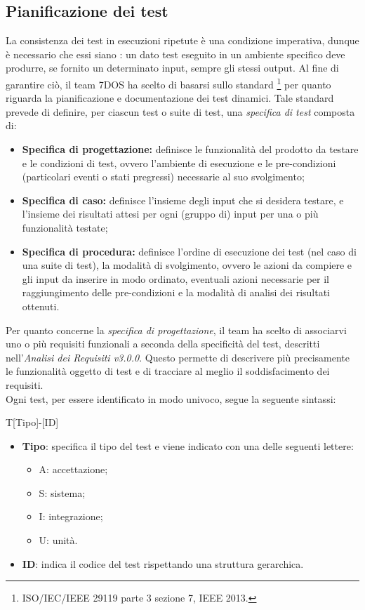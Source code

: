 \subsection{Pianificazione dei test}
La consistenza dei test in esecuzioni ripetute è una condizione imperativa, dunque è necessario che essi siano : un dato test eseguito in un ambiente specifico deve produrre, se fornito un determinato input, sempre gli stessi output. Al fine di garantire ciò, il team 7DOS ha scelto di basarsi sullo standard \footnote{ISO/IEC/IEEE 29119 parte 3 sezione 7, IEEE 2013.} per quanto riguarda la pianificazione e documentazione dei test dinamici. Tale standard prevede di definire, per ciascun test o suite di test, una \emph{specifica di test} composta di:
\begin{itemize}
	\item {\textbf{Specifica di progettazione:} definisce le funzionalità del prodotto da testare e le condizioni di test, ovvero l'ambiente di esecuzione e le pre-condizioni (particolari eventi o stati pregressi) necessarie al suo svolgimento;}
	\item {\textbf{Specifica di caso:} definisce l'insieme degli input che si desidera testare, e l'insieme dei risultati attesi per ogni (gruppo di) input per una o più funzionalità testate;}
	\item {\textbf{Specifica di procedura:} definisce l'ordine di esecuzione dei test (nel caso di una suite di test), la modalità di svolgimento, ovvero le azioni da compiere e gli input da inserire in modo ordinato, eventuali azioni necessarie per il raggiungimento delle pre-condizioni e la modalità di analisi dei risultati ottenuti.}
\end{itemize}

Per quanto concerne la \emph{specifica di progettazione}, il team ha scelto di associarvi uno o più requisiti funzionali a seconda della specificità del test, descritti nell'\emph{Analisi dei Requisiti v3.0.0}. Questo permette di descrivere più precisamente le funzionalità oggetto di test e di tracciare al meglio il soddisfacimento dei requisiti. \\

Ogni test, per essere identificato in modo univoco, segue la seguente sintassi:
\begin{center}
	T[Tipo]-[ID]
\end{center}
\begin{itemize}
	\item \textbf{Tipo}: specifica il tipo del test	e viene indicato con una delle seguenti lettere:
	\begin{itemize}
		\item A: accettazione;
		\item S: sistema;
		\item I: integrazione;
		\item U: unità.
	\end{itemize}
	\item \textbf{ID}: indica il codice del test rispettando una struttura gerarchica.	
\end{itemize}

